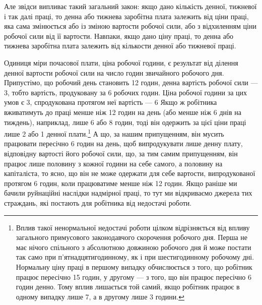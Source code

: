 Але звідси випливає такий загальний закон: якщо дано кількість
денної, тижневої і так далі праці, то денна або тижнева
заробітна плата залежить від ціни праці, яка сама змінюється
або із зміною вартости робочої сили, або з відхиленням ціни робочої
сили від її вартости. Навпаки, якщо дано ціну праці, то денна
або тижнева заробітна плата залежить від кількости денної або
тижневої праці.

Одиниця міри почасової плати, ціна робочої години, є результат
від ділення денної вартости робочої сили на число годин звичайного
робочого дня. Припустімо, що робочий день становить
12 годин, денна вартість робочої сили — 3, тобто вартість,
продуковану за 6 робочих годин. Ціна робочої години за
цих умов є 3, спродукована протягом неї вартість — 6
Якщо ж робітника вживатимуть до праці менше ніж 12 годин
на день (або менше ніж 6 днів на тиждень), наприклад, лише
6 або 8 годин, тоді він одержить за цієї ціни праці лише 2 або
1 денної плати.\footnote{
Вплив такої ненормальної недостачі роботи цілком відрізняється
від впливу загального примусового законодавчого скорочення робочого
дня. Перша не має нічого спільного з абсолютною довжиною робочого
дня й може постати так само при п’ятнадцятигодинному, як і при шестигодинному
робочому дні. Нормальну ціну праці в першому випадку обчислюється
з того, що робітник працює пересічно 15 годин, у другому — з
того, що він працює пересічно 6 годин денно. Тому вплив лишається той
самий, якщо робітник працює в одному випадку лише 7, а в другому
лише 3 години.
} А що, за нашим припущенням, він
мусить працювати пересічно 6 годин на день, щоб випродукувати
лише денну плату, відповідну вартості його робочої сили, що,
за тим самим припущенням, він працює лише половину з кожної
години на себе самого, а половину на капіталіста, то ясно, що
він не може одержати для себе вартости, випродукованої протягом
6 годин, коли працюватиме менше ніж 12 годин. Якщо раніше
ми бачили руйнаційні наслідки надмірної праці, то тут ми відкриваємо
джерела тих страждань, які постають для робітника від
недостачі роботи.

